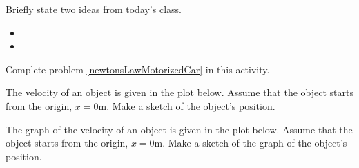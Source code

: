 \postClass

\begin{problem}
\item Briefly state two ideas from today's class.
  \begin{itemize}
  \item
  \item
  \end{itemize}
\item Complete problem \ref{newtonsLawMotorizedCar} in this activity.
\end{problem}



\begin{problem}
\item The velocity of an object is given in the plot below. Assume
  that the object starts from the origin, $x=0$m. Make a sketch of the
  object's position.

  \scalebox{0.7}{}

  \clearpage

\item The graph of the velocity of an object is given in the plot
  below. Assume that the object starts from the origin, $x=0$m. Make a
  sketch of the graph of the object's position.

  \scalebox{0.7}{}

\end{problem}


